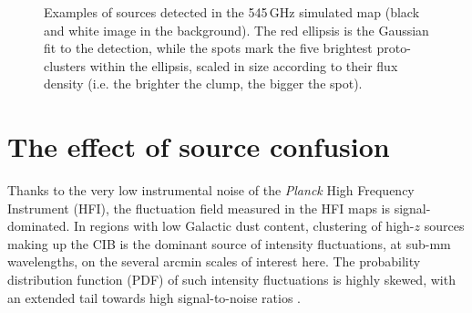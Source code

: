 \documentclass[useAMS,usenatbib]{mn2e}
\begin{document}
\begin{figure*}
  \hspace{-1.0cm}
  \begin{minipage}[b]{0.51\linewidth}
    \centering {} %
  \end{minipage}
  \hspace{0.0cm}
  \begin{minipage}[b]{0.51\linewidth}
    \centering {} %
  \end{minipage}
 \vspace{-1.1cm}
 \caption{Examples of sources detected in the 545\,GHz simulated map
   (black and white image in the background). The red ellipsis is the
   Gaussian fit to the detection,
   while  the spots mark the five brightest proto-clusters within the ellipsis,
   scaled in size according to their flux  density (i.e. the brighter the clump, the bigger the spot).}
 \label{fig:detections_examples}
\end{figure*}


\section{The effect of source confusion}\label{sec:simulations}


Thanks to the very low instrumental noise of the \textit{Planck} High
Frequency Instrument (HFI), the fluctuation field measured in the HFI maps
is signal-dominated. In regions with low Galactic dust content,
clustering of high-$z$ sources making up the CIB is the dominant
source of intensity fluctuations, at sub-mm wavelengths, on the
several arcmin scales of interest here. The probability distribution
function (PDF) of such intensity fluctuations is highly skewed, with
an extended tail towards high signal-to-noise ratios
\citep[cf. Fig.~10 of][]{DeZotti2015}.
\end{document}
